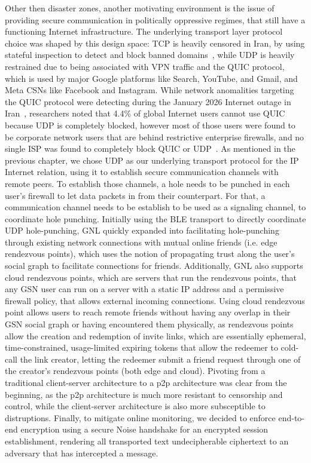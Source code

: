 Other then disaster zones, another motivating environment is the issue of providing secure communication in politically oppressive regimes, that still have a functioning Internet infrastructure. The underlying transport layer protocol choice was shaped by this design space: TCP is heavily censored in Iran, by using stateful inspection to detect and block banned domains~\cite{Aceto2026}, while UDP is heavily restrained due to being associated with VPN traffic and the QUIC protocol, which is used by major Google platforms like Search, YouTube, and Gmail, and Meta CSNs like Facebook and Instagram. While network anomalities targeting the QUIC protocol were detecting during the January 2026 Internet outage in Iran~\cite{Aceto2026}, researchers noted that 4.4\% of global Internet users cannot use QUIC because UDP is completely blocked, however most of those users were found to be corporate network users that are behind restrictive enterprise firewalls, and no single ISP was found to completely block QUIC or UDP~\cite{Langley2017}.
As mentioned in the previous chapter, we chose UDP as our underlying transport protocol for the IP Internet relation, using it to establish secure communication channels with remote peers. To establish those channels, a hole needs to be punched in each user's firewall to let data packets in from their counterpart. For that, a communication channel needs to be establish to be used as a signaling channel, to coordinate hole punching. Initially using the BLE transport to directly coordinate UDP hole-punching, GNL quickly expanded into facilitating hole-punching through existing network connections with mutual online friends (i.e. edge rendezvous points), which uses the notion of propagating trust along the user's social graph to facilitate connections for friends. Additionally, GNL also supports cloud rendezvous points, which are servers that run the rendezvous points, that any GSN user can run on a server with a static IP address and a permissive firewall policy, that allows external incoming connections. Using cloud rendezvous point allows users to reach remote friends without having any overlap in their GSN social graph or having encountered them physically, as rendezvous points allow the creation and redemption of invite links, which are essentially ephemeral, time-constrained, usage-limited expiring tokens that allow the redeemer to cold-call the link creator, letting the redeemer submit a friend request through one of the creator's rendezvous points (both edge and cloud).
Pivoting from a traditional client-server architecture to a p2p architecture was clear from the beginning, as the p2p architecture is much more resistant to censorship and control, while the client-server architecture is also more subsceptible to distruptions.
Finally, to mitigate online monitoring, we decided to enforce end-to-end encryption using a secure Noise handshake for an encrypted session establishment, rendering all transported text undecipherable ciphertext to an adversary that has intercepted a message.

